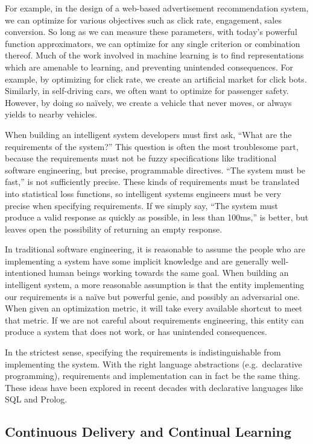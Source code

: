 \documentclass[12pt,initial,twoside,maitrise]{dms}
\numberwithin{equation}{section}
\numberwithin{table}{chapter}
\numberwithin{figure}{chapter}
\begin{document}
For example, in the design of a web-based advertisement recommendation system, we can optimize for various objectives such as click rate, engagement, sales conversion. So long as we can measure these parameters, with today's powerful function approximators, we can optimize for any single criterion or combination thereof. Much of the work involved in machine learning is to find representations which are amenable to learning, and preventing unintended consequences. For example, by optimizing for click rate, we create an artificial market for click bots. Similarly, in self-driving cars, we often want to optimize for passenger safety. However, by doing so na\"ively, we create a vehicle that never moves, or always yields to nearby vehicles.

When building an intelligent system developers must first ask, ``What are the requirements of the system?'' This question is often the most troublesome part, because the requirements must not be fuzzy specifications like traditional software engineering, but precise, programmable directives. ``The system must be fast,'' is not sufficiently precise. These kinds of requirements must be translated into statistical loss functions, so intelligent systems engineers must be very precise when specifying requirements. If we simply say, ``The system must produce a valid response as quickly as possible, in less than 100ms,'' is better, but leaves open the possibility of returning an empty response.

In traditional software engineering, it is reasonable to assume the people who are implementing a system have some implicit knowledge and are generally well-intentioned human beings working towards the same goal. When building an intelligent system, a more reasonable assumption is that the entity implementing our requirements is a na\"ive but powerful genie, and possibly an adversarial one. When given an optimization metric, it will take every available shortcut to meet that metric. If we are not careful about requirements engineering, this entity can produce a system that does not work, or has unintended consequences.

In the strictest sense, specifying the requirements is indistinguishable from implementing the system. With the right language abstractions (e.g.\ declarative programming), requirements and implementation can in fact be the same thing. These ideas have been explored in recent decades with declarative languages like SQL and Prolog.

\subsection{Continuous Delivery and Continual Learning}
\end{document}
